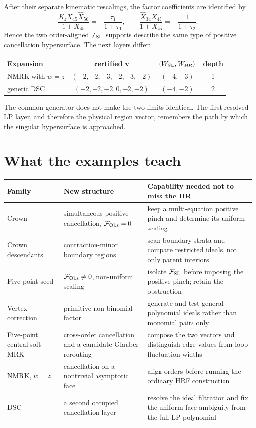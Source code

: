 \documentclass[a4paper,11pt]{article}
\newcommand{\FSL}{\mathcal F_{\rm SL}}
\newcommand{\FObs}{\mathcal F_{\rm Obs}}
\newcommand{\WSL}{W_{\rm SL}}
\newcommand{\WHR}{W_{\rm HR}}
\begin{document}
After their separate kinematic rescalings, the factor coefficients are
identified by
\begin{equation}
 \frac{K_zX_{45}\widehat X_{56}}{1+X_{45}}
 =-\frac{\tau_1}{1+\tau_1},
 \qquad
 \frac{\widehat X_{34}X_{45}}{1+X_{45}}
 =-\frac{1}{1+\tau_2}.
 \label{eq:composite-factor-map}
\end{equation}
Hence the two order-aligned \(\FSL\) supports describe the same type of
positive cancellation hypersurface.  The next layers differ:
\begin{center}
\begin{tabular}{@{}lccc@{}}
\toprule
Expansion & certified \(\boldsymbol v\) & \((\WSL,\WHR)\) & depth\\
\midrule
NMRK with \(w=z\) & \((-2,-2,-3,-2,-3,-2)\) & \((-4,-3)\) & 1\\
generic DSC & \((-2,-2,-2,0,-2,-2)\) & \((-4,-2)\) & 2\\
\bottomrule
\end{tabular}
\end{center}
The common generator does not make the two limits identical.  The first
resolved LP layer, and therefore the physical region vector, remembers the
path by which the singular hypersurface is approached.

\section{What the examples teach}

\begin{center}
\small
\begin{tabular}{@{}>{\raggedright\arraybackslash}p{}
                    >{\raggedright\arraybackslash}p{}
                    >{\raggedright\arraybackslash}p{}@{}}
\toprule
Family & New structure & Capability needed not to miss the HR\\
\midrule
Crown & simultaneous positive cancellation, \(\FObs=0\) & keep a
multi-equation positive pinch and determine its uniform scaling\\
Crown descendants & contraction-minor boundary regions & scan boundary
strata and compare restricted ideals, not only parent interiors\\
Five-point seed & \(\FObs\ne0\), non-uniform scaling & isolate \(\FSL\)
before imposing the positive pinch; retain the obstruction\\
Vertex correction & primitive non-binomial factor & generate and test
general polynomial ideals rather than monomial pairs only\\
Five-point central-soft MRK & cross-order cancellation and a candidate
Glauber rerouting & compose the two vectors and distinguish edge values from
loop fluctuation widths\\
NMRK, \(w=z\) & cancellation on a nontrivial asymptotic face & align
orders before running the ordinary HRF construction\\
DSC & a second occupied cancellation layer & resolve the ideal filtration
and fix the uniform face ambiguity from the full LP polynomial\\
\bottomrule
\end{tabular}
\end{center}
\end{document}
